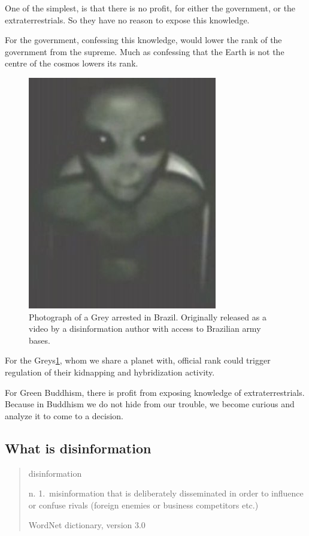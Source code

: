 \documentclass{report}
\begin{document}
One of the simplest, is that there is no profit, for either the government, or
the extraterrestrials.  So they have no reason to expose this knowledge.

For the government, confessing this knowledge, would lower the rank of the
government from the supreme. Much as confessing that the Earth is not the centre
of the cosmos lowers its rank.

\begin{figure}
  \includegraphics{photograph/gray-alien-upper-body.jpg}
  \caption{Photograph of a Grey arrested in Brazil. Originally released as a video by a
disinformation author with access to Brazilian army bases.}
\label{fig:grey}
\end{figure}

For the Greys\ref{fig:grey}, whom we share a planet with, official rank could trigger
regulation of their kidnapping and hybridization activity. 

For Green Buddhism, there is profit from exposing knowledge of
extraterrestrials. Because in Buddhism we do not hide from our trouble, we
become curious and analyze it to come to a decision.

\subsection{What is disinformation}
\label{disinformation}

\blockquote[WordNet dictionary, version 3.0]{disinformation

n. 1.\  misinformation that is deliberately disseminated in order to influence or
confuse rivals (foreign enemies or business competitors etc.)}
\end{document}

